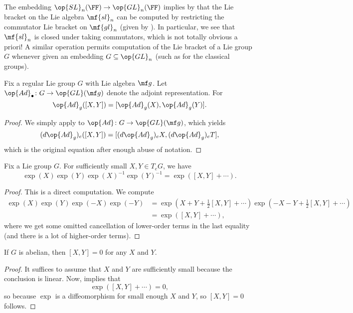 \documentclass[../notes.tex]{subfiles}
\begin{document}
\begin{example}
	The embedding $\op{SL}_n(\FF)\to\op{GL}_n(\FF)$ implies by  that the Lie bracket on the Lie algebra $\mf{sl}_n$ can be computed by restricting the commutator Lie bracket on $\mf{gl}_n$ (given by ). In particular, we see that $\mf{sl}_n$ is closed under taking commutators, which is not totally obvious a priori! A similar operation permits computation of the Lie bracket of a Lie group $G$ whenever given an embedding $G\subseteq\op{GL}_n$ (such as for the classical groups).
\end{example}
\begin{corollary} \label{cor:adjoint-commutator}
	Fix a regular Lie group $G$ with Lie algebra $\mf g$. Let $\op{Ad}_\bullet\colon G\to\op{GL}(\mf g)$ denote the adjoint representation. For
	\[\op{Ad}_g([X,Y])=[\op{Ad}_g(X),\op{Ad}_g(Y)].\]
\end{corollary}
\begin{proof}
	We simply apply  to $\op{Ad}\colon G\to\op{GL}(\mf g)$, which yields
	\[(d{\op{Ad}_g})_e([X,Y])=[(d{\op{Ad}_g})_eX,(d{\op{Ad}_g})_eT],\]
	which is the original equation after enough abuse of notation.
\end{proof}
\begin{proposition} \label{prop:exp-commutator}
	Fix a Lie group $G$. For sufficiently small $X,Y\in T_eG$, we have
	\[\exp(X)\exp(Y)\exp(X)^{-1}\exp(Y)^{-1}=\exp([X,Y]+\cdots).\]
\end{proposition}
\begin{proof}
	This is a direct computation. We compute
	\begin{align*}
		\exp(X)\exp(Y)\exp(-X)\exp(-Y) &= \exp\left(X+Y+\frac12[X,Y]+\cdots\right)\exp\left(-X-Y+\frac12[X,Y]+\cdots\right)\\
		&= \exp\left([X,Y]+\cdots\right),
	\end{align*}
	where we get some omitted cancellation of lower-order terms in the last equality (and there is a lot of higher-order terms).
\end{proof}
\begin{corollary}
	If $G$ is abelian, then $[X,Y]=0$ for any $X$ and $Y$.
\end{corollary}
\begin{proof}
	It suffices to assume that $X$ and $Y$ are sufficiently small because the conclusion is linear. Now,  implies that
	\[\exp([X,Y]+\cdots)=0,\]
	so because $\exp$ is a diffeomorphism for small enough $X$ and $Y$, so $[X,Y]=0$ follows.
\end{proof}
\end{document}
